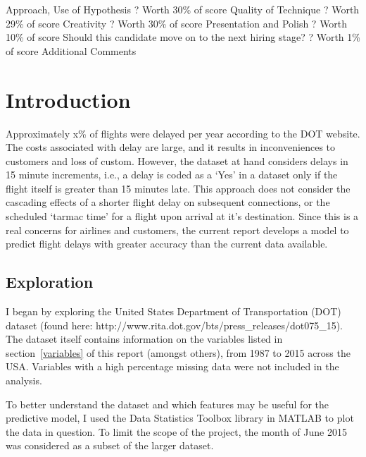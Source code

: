 \documentclass[a4paper, 11pt]{article}
\begin{document}
\clearpage

Approach, Use of Hypothesis ? Worth 30\% of score
Quality of Technique ? Worth 29\% of score
Creativity ? Worth 30\% of score
Presentation and Polish ? Worth 10\% of score
Should this candidate move on to the next hiring stage? ? Worth 1\% of score
Additional Comments
\clearpage

\section{Introduction}\label{intro}

Approximately x\% of flights were delayed per year according to the DOT website. The costs associated with delay are large, and it results in inconveniences to customers and loss of custom. However, the dataset at hand considers delays in 15 minute increments, i.e., a delay is coded as a `Yes' in a dataset only if the flight itself is greater than 15 minutes late. This approach does not consider the cascading effects of a shorter flight delay on subsequent connections, or the scheduled `tarmac time' for a flight upon arrival at it's destination. Since this is a real concerns for airlines and customers, the current report develops a model to predict flight delays with greater accuracy than the current data available. 

\subsection{Exploration}
I began by exploring the United States Department of Transportation (DOT) dataset (found here: http://www.rita.dot.gov/bts/press\_releases/dot075\_15). The dataset itself contains information on the variables listed in section~\ref{variables} of this report (amongst others), from 1987 to 2015 across the USA. Variables with a high percentage missing data were not included in the analysis.

\vspace{5mm}
To better understand the dataset and which features may be useful for the predictive model, I used the Data Statistics Toolbox library in MATLAB to plot the data in question. To limit the scope of the project, the month of June 2015 was considered as a subset of the larger dataset. 
\end{document}
